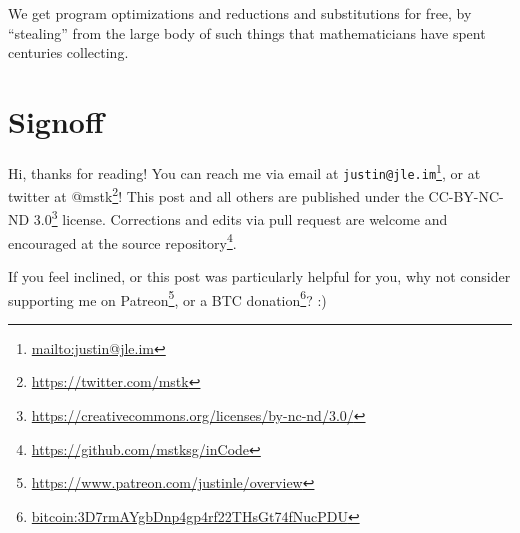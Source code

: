 \documentclass[]{article}
\renewcommand{\href}[2]{#2\footnote{\url{#1}}}
\begin{document}
We get program optimizations and reductions and substitutions for free, by
``stealing'' from the large body of such things that mathematicians have spent
centuries collecting.

\hypertarget{signoff}{%
\section{Signoff}\label{signoff}}

Hi, thanks for reading! You can reach me via email at
\href{mailto:justin@jle.im}{\nolinkurl{justin@jle.im}}, or at twitter at
\href{https://twitter.com/mstk}{@mstk}! This post and all others are published
under the \href{https://creativecommons.org/licenses/by-nc-nd/3.0/}{CC-BY-NC-ND
3.0} license. Corrections and edits via pull request are welcome and encouraged
at \href{https://github.com/mstksg/inCode}{the source repository}.

If you feel inclined, or this post was particularly helpful for you, why not
consider \href{https://www.patreon.com/justinle/overview}{supporting me on
Patreon}, or a \href{bitcoin:3D7rmAYgbDnp4gp4rf22THsGt74fNucPDU}{BTC donation}?
:)
\end{document}
